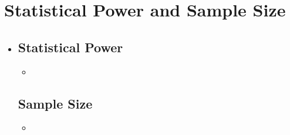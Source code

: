 \section{Statistical Power and Sample Size}
\begin{itemize}
  \item []
  
  \subsection{Statistical Power}
  \begin{itemize}
    \item 
  \end{itemize}

  \subsection{Sample Size}
  \begin{itemize}
    \item 
  \end{itemize}
  
\end{itemize}




















  


